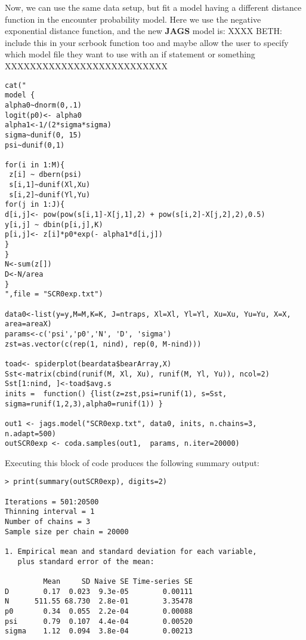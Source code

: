 Now, we can use the same data setup, but fit a model having a
different distance function in the encounter probability model. Here
we use the negative exponential distance function, and the new 
{\bf JAGS} model is:  XXXX BETH: include this in your scrbook
 function too and maybe allow the user to specify which model file
 they want to use with an if statement or something XXXXXXXXXXXXXXXXXXXXXXXXXX
{\small
\begin{verbatim}
cat("
model {
alpha0~dnorm(0,.1)
logit(p0)<- alpha0
alpha1<-1/(2*sigma*sigma)
sigma~dunif(0, 15)
psi~dunif(0,1)

for(i in 1:M){
 z[i] ~ dbern(psi)
 s[i,1]~dunif(Xl,Xu)
 s[i,2]~dunif(Yl,Yu)
for(j in 1:J){
d[i,j]<- pow(pow(s[i,1]-X[j,1],2) + pow(s[i,2]-X[j,2],2),0.5)
y[i,j] ~ dbin(p[i,j],K)
p[i,j]<- z[i]*p0*exp(- alpha1*d[i,j])
}
}
N<-sum(z[])
D<-N/area
}
",file = "SCR0exp.txt")

data0<-list(y=y,M=M,K=K, J=ntraps, Xl=Xl, Yl=Yl, Xu=Xu, Yu=Yu, X=X, area=areaX)
params<-c('psi','p0','N', 'D', 'sigma')
zst=as.vector(c(rep(1, nind), rep(0, M-nind)))

toad<- spiderplot(beardata$bearArray,X)
Sst<-matrix(cbind(runif(M, Xl, Xu), runif(M, Yl, Yu)), ncol=2)
Sst[1:nind, ]<-toad$avg.s
inits =  function() {list(z=zst,psi=runif(1), s=Sst, sigma=runif(1,2,3),alpha0=runif(1)) }

out1 <- jags.model("SCR0exp.txt", data0, inits, n.chains=3, n.adapt=500)
outSCR0exp <- coda.samples(out1,  params, n.iter=20000)
\end{verbatim}
}
Executing this block of code produces the following summary output:
{\small
\begin{verbatim}
> print(summary(outSCR0exp), digits=2)

Iterations = 501:20500
Thinning interval = 1 
Number of chains = 3 
Sample size per chain = 20000 

1. Empirical mean and standard deviation for each variable,
   plus standard error of the mean:

         Mean     SD Naive SE Time-series SE
D        0.17  0.023  9.3e-05        0.00111
N      511.55 68.730  2.8e-01        3.35478
p0       0.34  0.055  2.2e-04        0.00088
psi      0.79  0.107  4.4e-04        0.00520
sigma    1.12  0.094  3.8e-04        0.00213

\end{verbatim}
}


